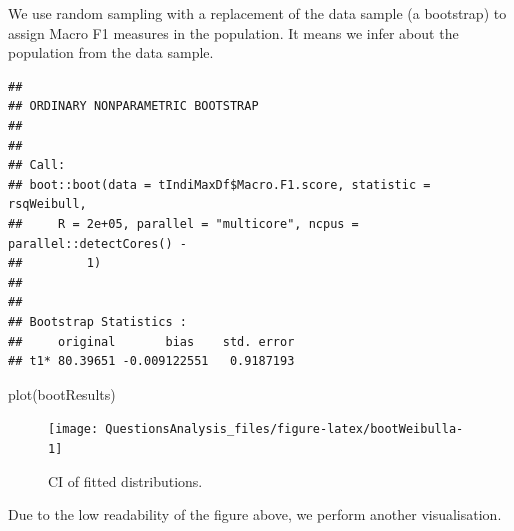 \documentclass[
]{article}
\newenvironment{Shaded}{\begin{snugshade}}{\end{snugshade}}
\newcommand{\AttributeTok}[1]{\textcolor[rgb]{0.77,0.63,0.00}{#1}}
\newcommand{\DecValTok}[1]{\textcolor[rgb]{0.00,0.00,0.81}{#1}}
\newcommand{\FunctionTok}[1]{\textcolor[rgb]{0.00,0.00,0.00}{#1}}
\newcommand{\NormalTok}[1]{#1}
\newcommand{\OtherTok}[1]{\textcolor[rgb]{0.56,0.35,0.01}{#1}}
\newcommand{\SpecialCharTok}[1]{\textcolor[rgb]{0.00,0.00,0.00}{#1}}
\newcommand{\StringTok}[1]{\textcolor[rgb]{0.31,0.60,0.02}{#1}}
\begin{document}
We use random sampling with a replacement of the data sample (a bootstrap) to assign Macro F1 measures in the population. It means we infer about the population from the data sample.

\begin{Shaded}
\end{Shaded}

\begin{verbatim}
## 
## ORDINARY NONPARAMETRIC BOOTSTRAP
## 
## 
## Call:
## boot::boot(data = tIndiMaxDf$Macro.F1.score, statistic = rsqWeibull, 
##     R = 2e+05, parallel = "multicore", ncpus = parallel::detectCores() - 
##         1)
## 
## 
## Bootstrap Statistics :
##     original       bias    std. error
## t1* 80.39651 -0.009122551   0.9187193
\end{verbatim}

\begin{Shaded}
\begin{Highlighting}[]
\FunctionTok{plot}\NormalTok{(bootResults)}
\end{Highlighting}
\end{Shaded}

\begin{figure}

{\centering \texttt{[image: QuestionsAnalysis\_files/figure-latex/bootWeibulla-1]} 

}

\caption{CI of fitted distributions.}\label{fig:bootWeibulla}
\end{figure}

Due to the low readability of the figure above, we perform another visualisation.
\end{document}
